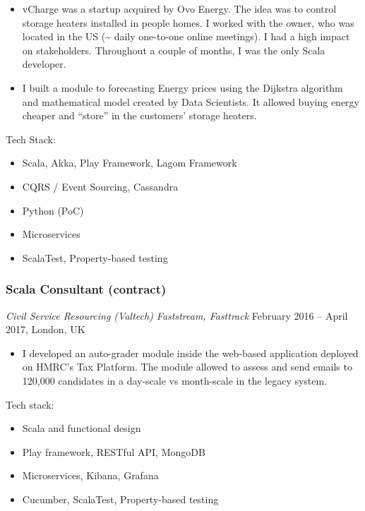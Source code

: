 \documentclass[]{rss}
\providecommand{\tightlist}{%
  \setlength{\itemsep}{0pt}\setlength{\parskip}{0pt}}
\begin{document}
\begin{resume}
\begin{itemize}
\item
  vCharge was a startup acquired by Ovo Energy. The idea was to control
  storage heaters installed in people homes. I worked with the owner,
  who was located in the US (\textasciitilde{} daily one-to-one online
  meetings). I had a high impact on stakeholders. Throughout a couple of
  months, I was the only Scala developer.
\item
  I built a module to forecasting Energy prices using the Dijkstra
  algorithm and mathematical model created by Data Scientists. It
  allowed buying energy cheaper and ``store'' in the customers' storage
  heaters.
\end{itemize}

Tech Stack:

\begin{itemize}
\tightlist
\item
  Scala, Akka, Play Framework, Lagom Framework
\item
  CQRS / Event Sourcing, Cassandra
\item
  Python (PoC)
\item
  Microservices
\item
  ScalaTest, Property-based testing
\end{itemize}

\subsubsection{Scala Consultant
(contract)}\label{scala-consultant-contract}

\emph{Civil Service Resourcing (Valtech) \textbar{} Faststream,
Fasttrack} February 2016 -- April 2017, London, UK

\begin{itemize}
\tightlist
\item
  I developed an auto-grader module inside the web-based application
  deployed on HMRC's Tax Platform. The module allowed to assess and send
  emails to 120,000 candidates in a day-scale vs month-scale in the
  legacy system.
\end{itemize}

Tech stack:

\begin{itemize}
\tightlist
\item
  Scala and functional design
\item
  Play framework, RESTful API, MongoDB
\item
  Microservices, Kibana, Grafana
\item
  Cucumber, ScalaTest, Property-based testing
\end{itemize}


\end{resume}
\end{document}

